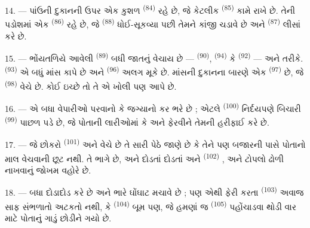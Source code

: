 14. --- પાંઉની દુકાનની ઉપર એક કુશળ 
\textsuperscript{(84)} રહે છે, જે કેટલીક 
\textsuperscript{(85)} કામે રાખે છે. તેની પડોશમાં એક  \textsuperscript{(86)} રહે છે, જે 
\textsuperscript{(88)} ધોઈ-સૂકવ્યા પછી તેમને કાંજી ચડાવે છે અને
 \textsuperscript{(87)} લીસાં કરે છે.

\VUsaut{4.0mm}
\VUsaut{3.0mm}

15. --- ભોંયતળિયે આવેલી 
\textsuperscript{(89)} બધી જાતનું  વેચાય છે —
 \textsuperscript{(90)}, 
\textsuperscript{(94)} કે 
\textsuperscript{(92)} — 
અને  તરીકે. 
\textsuperscript{(93)} એ બધું માંસ કાપે છે અને  \textsuperscript{(96)} અલગ મૂકે છે. માંસની દુકાનના બારણે એક
 \textsuperscript{(97)} છે, જે 
\textsuperscript{(98)} વેચે છે. કોઈ ઇચ્છે તો તે એ ખોલી પણ આપે છે.

16. --- એ બધા વેપારીઓ પરવાનો કે જગ્યાનો કર ભરે છે ; એટલે
 \textsuperscript{(100)} નિર્દયપણે બિચારી  \textsuperscript{(99)} પાછળ પડે છે, જે પોતાની
લારીઓમાં  કે  અને  ફેરવીને તેમની
હરીફાઈ કરે છે.

\VUsaut{4.0mm}
\VUsaut{3.0mm}

17. --- જે છોકરો  \textsuperscript{(101)} અને
 વેચે છે તે સારી પેઠે જાણે છે કે તેને પણ બજારની પાસે
પોતાનો માલ વેચવાની છૂટ નથી. તે ભાગે છે, અને દોડતાં દોડતાં
 અને  
\textsuperscript{(102)} ,  અને
 ટોપલો ઢોળી નાખવાનું જોખમ વહોરે છે.

18. --- બધા દોડાદોડ કરે છે અને ભારે ઘોંઘાટ મચાવે છે ; પણ એથી ફેરી
કરતા  \textsuperscript{(103)} અવાજ સાફ સંભળાતો
અટકતો નથી, કે  \textsuperscript{(104)} બૂમ પણ, જે
હમણાં જ  \textsuperscript{(105)} પહોંચાડવા થોડી વાર
માટે પોતાનું ગાડું છોડીને ગયો છે.

\VUsaut{6.0mm}
\VUfilet{22mm}
